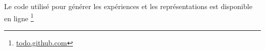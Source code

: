 \documentclass[../main]{subfiles}
\begin{document}
Le code utilisé pour générer les expériences et les représentations est disponible en ligne \footnote{\url{todo.github.com}}



\end{document}
